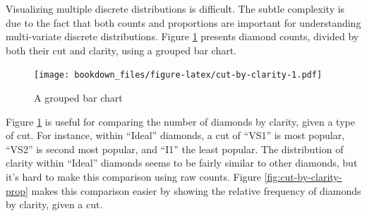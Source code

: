 \documentclass[12pt,]{isuthesis}
\newenvironment{Shaded}{\begin{snugshade}}{\end{snugshade}}
\newcommand{\KeywordTok}[1]{\textcolor[rgb]{0.13,0.29,0.53}{\textbf{{#1}}}}
\newcommand{\DataTypeTok}[1]{\textcolor[rgb]{0.13,0.29,0.53}{{#1}}}
\newcommand{\StringTok}[1]{\textcolor[rgb]{0.31,0.60,0.02}{{#1}}}
\newcommand{\CommentTok}[1]{\textcolor[rgb]{0.56,0.35,0.01}{\textit{{#1}}}}
\newcommand{\NormalTok}[1]{{#1}}
\begin{document}
Visualizing multiple discrete distributions is difficult. The subtle
complexity is due to the fact that both counts and proportions are
important for understanding multi-variate discrete distributions. Figure
\ref{fig:cut-by-clarity} presents diamond counts, divided by both their
cut and clarity, using a grouped bar chart.

\begin{Shaded}
\end{Shaded}

\begin{figure}[htbp]
\centering
\texttt{[image: bookdown\_files/figure-latex/cut-by-clarity-1.pdf]}
\caption{\label{fig:cut-by-clarity}A grouped bar chart}
\end{figure}

Figure \ref{fig:cut-by-clarity} is useful for comparing the number of
diamonds by clarity, given a type of cut. For instance, within ``Ideal''
diamonds, a cut of ``VS1'' is most popular, ``VS2'' is second most
popular, and ``I1'' the least popular. The distribution of clarity
within ``Ideal'' diamonds seems to be fairly similar to other diamonds,
but it's hard to make this comparison using raw counts. Figure
\ref{fig:cut-by-clarity-prop} makes this comparison easier by showing
the relative frequency of diamonds by clarity, given a cut.

\begin{Shaded}
\end{Shaded}
\end{document}
